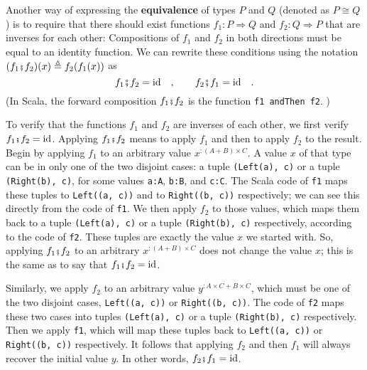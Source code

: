 Another way of expressing the \textbf{equivalence} of types $P$ and
$Q$ (denoted as $P\cong Q$) is to require that there should exist
functions $f_{1}:P\Rightarrow Q$ and $f_{2}:Q\Rightarrow P$ that
are inverses for each other: Compositions of $f_{1}$ and $f_{2}$
in both directions must be equal to an identity function. We can rewrite
these conditions using the notation $(f_{1}\bef f_{2})(x)\triangleq f_{2}(f_{1}(x))$
as
\[
f_{1}\bef f_{2}=\text{id}\quad,\quad\quad f_{2}\bef f_{1}=\text{id}\quad.
\]
(In Scala, the forward composition $f_{1}\bef f_{2}$ is the function
\lstinline!f1 andThen f2!.
)

To verify that the functions $f_{1}$ and $f_{2}$ are inverses of
each other, we first verify $f_{1}\bef f_{2}=\text{id}$. Applying
$f_{1}\bef f_{2}$ means to apply $f_{1}$ and then to apply $f_{2}$
to the result. Begin by applying $f_{1}$ to an arbitrary value $x^{:(A+B)\times C}$.
A value $x$ of that type can be in only one of the two disjoint cases:
a tuple \lstinline!(Left(a), c)!
or a tuple \lstinline!(Right(b), c)!,
for some values \lstinline!a:A!,
\lstinline!b:B!, and \lstinline!c:C!.
The Scala code of \lstinline!f1!
maps these tuples to \lstinline!Left((a, c))!
and to \lstinline!Right((b, c))!
respectively; we can see this directly from the code of \lstinline!f1!.
We then apply $f_{2}$ to those values, which maps them back to a
tuple \lstinline!(Left(a), c)!
or a tuple \lstinline!(Right(b), c)!
respectively, according to the code of \lstinline!f2!.
These tuples are exactly the value $x$ we started with. So, applying
$f_{1}\bef f_{2}$ to an arbitrary $x^{:(A+B)\times C}$ does not
change the value $x$; this is the same as to say that $f_{1}\bef f_{2}=\text{id}$.

Similarly, we apply $f_{2}$ to an arbitrary value $y^{:A\times C+B\times C}$,
which must be one of the two disjoint cases, \lstinline!Left((a, c))!
or \lstinline!Right((b, c))!.
The code of \lstinline!f2!
maps these two cases into tuples \lstinline!(Left(a), c)!
or a tuple \lstinline!(Right(b), c)!
respectively. Then we apply \lstinline!f1!,
which will map these tuples back to \lstinline!Left((a, c))!
or \lstinline!Right((b, c))!
respectively. It follows that applying $f_{2}$ and then $f_{1}$
will always recover the initial value $y$. In other words, $f_{2}\bef f_{1}=\text{id}$.

